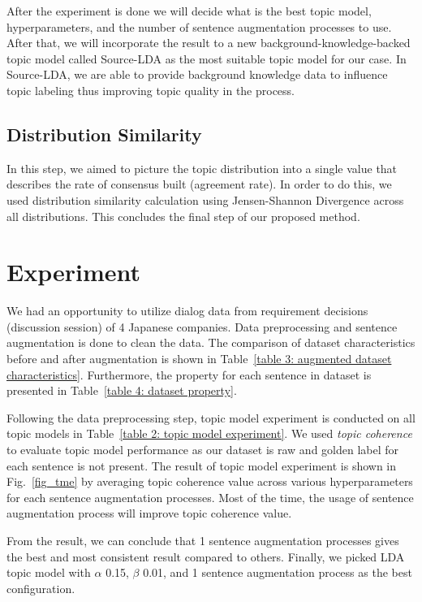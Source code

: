 \documentclass[conference]{IEEEtran}
\begin{document}
After the experiment is done we will decide what is the best topic model, hyperparameters, and the number of sentence augmentation processes to use. After that, we will incorporate the result to a new background-knowledge-backed topic model called Source-LDA\cite{b9} as the most suitable topic model for our case. In Source-LDA, we are able to provide background knowledge data to influence topic labeling thus improving topic quality in the process.

\subsection{Distribution Similarity}
In this step, we aimed to picture the topic distribution into a single value that describes the rate of consensus built (agreement rate). In order to do this, we used distribution similarity calculation using Jensen-Shannon Divergence across all distributions\cite{b10}. This concludes the final step of our proposed method.

\section{Experiment}
We had an opportunity to utilize dialog data from requirement decisions (discussion session) of 4 Japanese companies. Data preprocessing and sentence augmentation is done to clean the data. The comparison of dataset characteristics before and after augmentation is shown in Table~\ref{table 3: augmented dataset characteristics}. Furthermore, the property for each sentence in dataset is presented in Table~\ref{table 4: dataset property}.

Following the data preprocessing step, topic model experiment is conducted on all topic models in Table~\ref{table 2: topic model experiment}. We used {\it topic coherence} to evaluate topic model performance as our dataset is raw and golden label for each sentence is not present\cite{b6}. The result of topic model experiment is shown in Fig.~\ref{fig_tme} by averaging topic coherence value across various hyperparameters for each sentence augmentation processes. Most of the time, the usage of sentence augmentation process will improve topic coherence value.

From the result, we can conclude that 1 sentence augmentation processes gives the best and most consistent result compared to others.  Finally, we picked LDA topic model with $\alpha$ 0.15, $\beta$ 0.01, and 1 sentence augmentation process as the best configuration.
\end{document}
